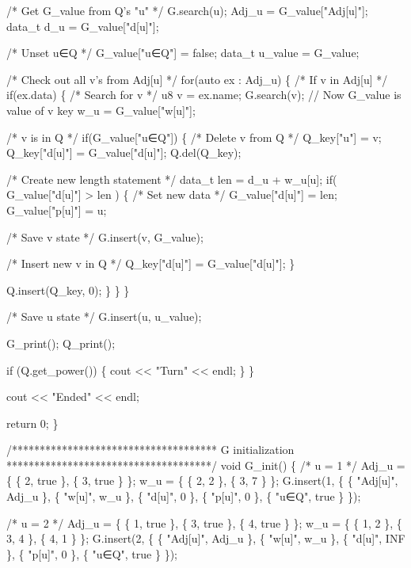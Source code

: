 \begin{DoxyCode}
    /* Get G\_value from Q's "u" */
    G.search(u);
    Adj\_u      = G\_value["Adj[u]"];
    data\_t d\_u = G\_value["d[u]"];

    /* Unset u∈Q */
    G\_value["u∈Q"] = false;
    data\_t u\_value = G\_value;

    /* Check out all v's from Adj[u] */
    for(auto ex : Adj\_u)
    \{
      /* If v in Adj[u] */
      if(ex.data)
      \{
        /* Search for v */
        u8 v = ex.name;
        G.search(v); // Now G\_value is value of v key
        w\_u = G\_value["w[u]"];

        /* v is in Q */
        if(G\_value["u∈Q"])
        \{
          /* Delete v from Q */
          Q\_key["u"]    = v;
          Q\_key["d[u]"] = G\_value["d[u]"];
          Q.del(Q\_key);

          /* Create new length statement */
          data\_t len = d\_u + w\_u[u];
          if( G\_value["d[u]"] > len )
          \{
            /* Set new data */
            G\_value["d[u]"] = len;
            G\_value["p[u]"] = u;

            /* Save v state */
            G.insert(v, G\_value);

            /* Insert new v in Q */
            Q\_key["d[u]"] = G\_value["d[u]"];
          \}

          Q.insert(Q\_key, 0);
        \}
      \}
    \}

    /* Save u state */
    G.insert(u, u\_value);

    G\_print();
    Q\_print();

    if (Q.get\_power())
    \{
      cout << "Turn" << endl;
    \}
  \}

  cout << "Ended" << endl;

  return 0;
\}

/*************************************
  G initialization
*************************************/
void G\_init()
\{
  /* u = 1 */
  Adj\_u  = \{ \{ 2, true \}, \{ 3, true \} \};
  w\_u    = \{ \{ 2, 2    \}, \{ 3, 7    \} \};
  G.insert(1, \{
    \{ "Adj[u]", Adj\_u \},
    \{ "w[u]",   w\_u   \},
    \{ "d[u]",   0     \},
    \{ "p[u]",   0     \},
    \{ "u∈Q",    true  \} 
  \});

  /* u = 2 */
  Adj\_u  = \{ \{ 1, true \}, \{ 3, true \}, \{ 4, true \} \};
  w\_u    = \{ \{ 1, 2    \}, \{ 3, 4    \}, \{ 4, 1    \} \};
  G.insert(2, \{
    \{ "Adj[u]", Adj\_u \},
    \{ "w[u]",   w\_u   \},
    \{ "d[u]",   INF   \},
    \{ "p[u]",   0     \},
    \{ "u∈Q",    true  \} 
  \});


\end{DoxyCode}
